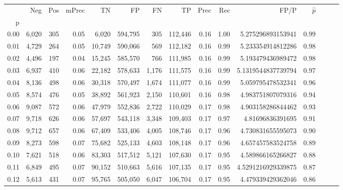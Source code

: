 \begin{tabular}{rrrrrrrrrrrrrrr}
\toprule
{} &     Neg &    Pos & mPrec &       TN &       FP &       FN &       TP &  Prec &   Rec &                  FP/P & $\hat{p}$ \\
p    &         &        &       &          &          &          &          &       &       &                       &           \\
\midrule
0.00 &   6,020 &    305 &  0.05 &    6,020 &  594,795 &      305 &  112,446 &  0.16 &  1.00 &     5.275296893153941 &      0.99 \\
0.01 &   4,729 &    264 &  0.05 &   10,749 &  590,066 &      569 &  112,182 &  0.16 &  0.99 &     5.233354914812286 &      0.98 \\
0.02 &   4,496 &    197 &  0.04 &   15,245 &  585,570 &      766 &  111,985 &  0.16 &  0.99 &     5.193479436989472 &      0.98 \\
0.03 &   6,937 &    410 &  0.06 &   22,182 &  578,633 &    1,176 &  111,575 &  0.16 &  0.99 &    5.1319544837739794 &      0.97 \\
0.04 &   8,136 &    498 &  0.06 &   30,318 &  570,497 &    1,674 &  111,077 &  0.16 &  0.99 &     5.059795478532341 &      0.96 \\
0.05 &   8,574 &    476 &  0.05 &   38,892 &  561,923 &    2,150 &  110,601 &  0.16 &  0.98 &     4.983751807079316 &      0.94 \\
0.06 &   9,087 &    572 &  0.06 &   47,979 &  552,836 &    2,722 &  110,029 &  0.17 &  0.98 &     4.903158286844462 &      0.93 \\
0.07 &   9,718 &    626 &  0.06 &   57,697 &  543,118 &    3,348 &  109,403 &  0.17 &  0.97 &      4.81696836391695 &      0.91 \\
0.08 &   9,712 &    657 &  0.06 &   67,409 &  533,406 &    4,005 &  108,746 &  0.17 &  0.96 &     4.730831655595073 &      0.90 \\
0.09 &   8,273 &    598 &  0.07 &   75,682 &  525,133 &    4,603 &  108,148 &  0.17 &  0.96 &     4.657457583524758 &      0.89 \\
0.10 &   7,621 &    518 &  0.06 &   83,303 &  517,512 &    5,121 &  107,630 &  0.17 &  0.95 &     4.589866165266827 &      0.88 \\
0.11 &   6,849 &    495 &  0.07 &   90,152 &  510,663 &    5,616 &  107,135 &  0.17 &  0.95 &    4.5291216929339875 &      0.87 \\
0.12 &   5,613 &    431 &  0.07 &   95,765 &  505,050 &    6,047 &  106,704 &  0.17 &  0.95 &     4.479339429362046 &      0.86 \\

\end{tabular}
